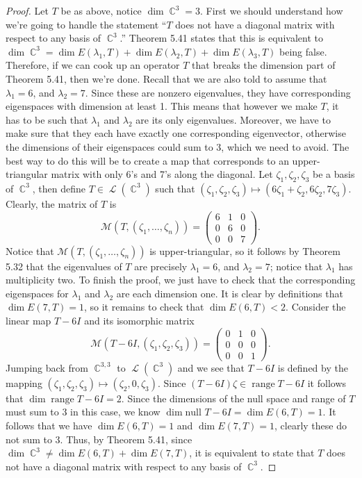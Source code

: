 \documentclass[letterpaper, 12pt]{amsart}
\DeclareMathOperator{\C}{\mathbb{C}}				%
\DeclareMathOperator{\Ell}{\mathscr{L}}				%
\renewcommand{\null}{\text{null }}					%
\DeclareMathOperator{\range}{\text{range }}			%
\theoremstyle{definition}  							%
\begin{document}
		\begin{proof}
		Let $T$ be as above, notice $\dim \C^{3} = 3$.
		First we should understand how we're going to handle the statement ``$T$ does not have a diagonal matrix with respect to any basis of $\C^{3}$.''
		Theorem 5.41 states that this is equivalent to $\dim \C^{3} = \dim E(\lambda_{1},T) + \dim E(\lambda_{2},T) + \dim E(\lambda_{3},T)$ being false.
		Therefore, if we can cook up an operator $T$ that breaks the dimension part of Theorem 5.41, then we're done.
		Recall that we are also told to assume that $\lambda_{1} = 6$, and $\lambda_{2} = 7$.
		Since these are nonzero eigenvalues, they have corresponding eigenspaces with dimension at least 1.
		This means that however we make $T$, it has to be such that $\lambda_{1}$ and $\lambda_{2}$ are its only eigenvalues.
		Moreover, we have to make sure that they each have exactly one corresponding eigenvector, otherwise the dimensions of their eigenspaces could sum to 3, which we need to avoid.
		The best way to do this will be to create a map that corresponds to an upper-triangular matrix with only 6's and 7's along the diagonal.
		Let $\zeta_{1},\zeta_{2},\zeta_{3}$ be a basis of $\C^{3}$, then define $T \in \Ell(\C^{3})$ such that $(\zeta_{1},\zeta_{2},\zeta_{3}) \mapsto (6\zeta_{1} + \zeta_{2}, 6\zeta_{2}, 7\zeta_{3})$.
		Clearly, the matrix of $T$ is $$\mathcal{M}(T,(\zeta_{1}, \dots, \zeta_{n})) = \begin{pmatrix} 6 & 1 & 0 \\ 0 & 6 & 0 \\ 0 & 0 & 7 \end{pmatrix}.$$
		Notice that $\mathcal{M}(T,(\zeta_{1}, \dots, \zeta_{n}))$ is upper-triangular, so it follows by Theorem 5.32 that the eigenvalues of $T$ are precisely $\lambda_{1} = 6$, and $\lambda_{2} = 7$; notice that $\lambda_{1}$ has multiplicity two.
		To finish the proof, we just have to check that the corresponding eigenspaces for $\lambda_{1}$ and $\lambda_{2}$ are each dimension one.
		It is clear by definitions that $\dim E(7,T) = 1$, so it remains to check that $\dim E(6,T) < 2$.
		Consider the linear map $T - 6I$ and its isomorphic matrix $$\mathcal{M}(T - 6I, (\zeta_{1},\zeta_{2},\zeta_{3})) = \begin{pmatrix} 0 & 1 & 0 \\ 0 & 0 & 0 \\ 0 & 0 & 1 \end{pmatrix}.$$
		Jumping back from $\C^{3,3}$ to $\Ell(\C^3)$ and we see that $T - 6I$ is defined by the mapping $(\zeta_{1},\zeta_{2},\zeta_{3}) \mapsto (\zeta_{2},0,\zeta_{3})$.
		Since $(T - 6I)\zeta \in \range T - 6I$ it follows that $\dim \range T - 6I = 2$.
		Since the dimensions of the null space and range of $T$ must sum to 3 in this case, we know $\dim \null T - 6I = \dim E(6,T) = 1$.			
		It follows that we have $\dim E(6,T) = 1$ and $\dim E(7,T) = 1$, clearly these do not sum to 3.
		Thus, by Theorem 5.41, since $\dim \C^3 \neq \dim E(6,T) + \dim E(7,T)$, it is equivalent to state that $T$ does not have a diagonal matrix with respect to any basis of $\C^{3}$.
		\end{proof}
\end{document}
